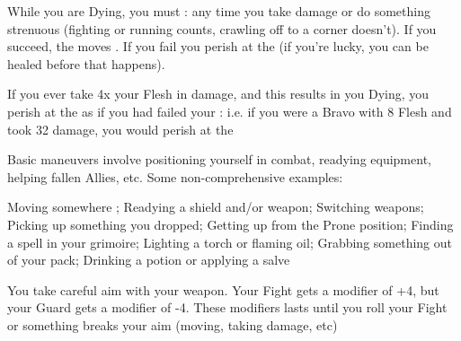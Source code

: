 {  

  While you are Dying, you must \RS : \DEATH any time you take damage or do something strenuous (fighting or running counts, crawling off to a corner doesn't). If you succeed, the \DEATH moves \DCDOWN. If you fail you perish at the  (if you're lucky, you can be healed before that happens).


  If you ever take 4x your \MAX Flesh in damage, and this results in you Dying, you perish at the  as if you had failed your \RS : \DEATH i.e. if you were a Bravo with 8 Flesh and took 32 damage, you would perish at the 




  Basic maneuvers involve positioning yourself in combat, readying equipment, helping fallen Allies, etc.  Some non-comprehensive examples:

  Moving somewhere ;  Readying a shield and/or weapon; Switching weapons; Picking up something you dropped; Getting up from the Prone position; Finding a spell in your grimoire; Lighting a torch or flaming oil; Grabbing something out of your pack; Drinking a potion or applying a salve




  
  You take careful aim with your weapon. Your  Fight \RO gets a modifier of +4, but your Guard \RO gets a modifier of -4.  These modifiers lasts until you roll your Fight \RO or something breaks your aim (moving, taking damage, etc)

}
